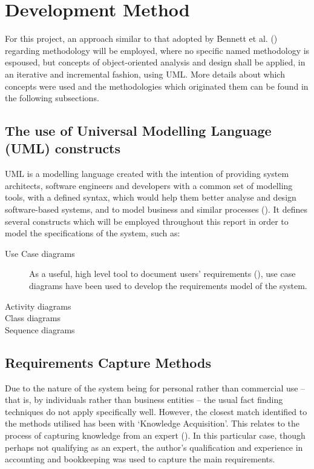 \section{Development Method} \label{sec:DevelopmentMethod}
For this project, an approach similar to that adopted by Bennett et al.
(\citeyear[][p.~77]{bennett2010object}) regarding methodology will be employed,
where no specific named methodology is espoused, but concepts of
object-oriented analysis and design shall be applied, in an iterative and
incremental fashion, using UML. More details about which concepts were used and
the methodologies which originated them can be found in the following
subsections.

\subsection{The use of Universal Modelling Language (UML) constructs}
\label{sec:Introduction.methodology.uml}

UML is a modelling language created with the intention of providing system
architects, software engineers and developers with a common set of modelling
tools, with a defined syntax, which would help them better analyse and design
software-based systems, and to model business and similar processes
(\cite[][p.~43]{omg2015uml}). It defines several constructs which will be
employed throughout this report in order to model the specifications of the
system, such as:
\begin{description}
  \item[Use Case diagrams]
    As a useful, high level tool to document users' requirements
    (\cite[][p.~138]{bennett2010object}), use case diagrams have been used to
    develop the requirements model of the system.

  \item[Activity diagrams]

  \item[Class diagrams]
    
  \item[Sequence diagrams]
\end{description}


\subsection{Requirements Capture Methods} \label{sec:DevelopmentMethod.RequirementsCapture}
Due to the nature of the system being for personal rather than commercial use
-- that is, by individuals rather than business entities -- the usual fact
finding techniques do not apply specifically well. However, the closest match
identified to the methods utilised has been with `Knowledge Acquisition'. This
relates to the process of capturing knowledge from an expert
(\cite[][p.~150]{bennett2010object}). In this particular case, though perhaps
not qualifying as an expert, the author's qualification and experience in
accounting and bookkeeping was used to capture the main requirements.

